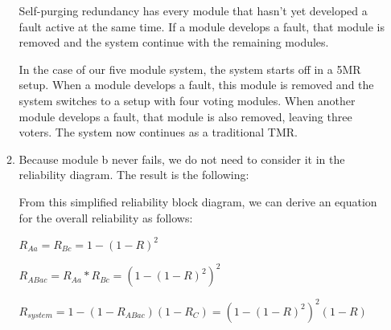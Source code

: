 \documentclass[a4paper,12pt]{article}
\begin{document}
\begin{enumerate}
\begin{enumerate}
                    Self-purging redundancy has every module that hasn't yet developed a fault active at the same time. If a module develops a fault, that module is removed and the system continue with the remaining modules.

                    In the case of our five module system, the system starts off in a 5MR setup. When a module develops a fault, this module is removed and the system switches to a setup with four voting modules. When another module develops a fault, that module is also removed, leaving three voters. The system now continues as a traditional TMR.

                \item Because module b never fails, we do not need to consider it in the reliability diagram. The result is the following:


                    From this simplified reliability block diagram, we can derive an equation for the overall reliability as follows:

                    $R_{Aa} = R_{Bc} = 1 - (1 - R)^2$

                    $R_{ABac} = R_{Aa} * R_{Bc} = (1 - (1 - R)^2)^2$

                    $R_{system} = 1 - (1 - R_{ABac})(1 - R_C) = (1 - (1 - R)^2)^2(1 - R) $


\end{enumerate}
\end{enumerate}
\end{document}

